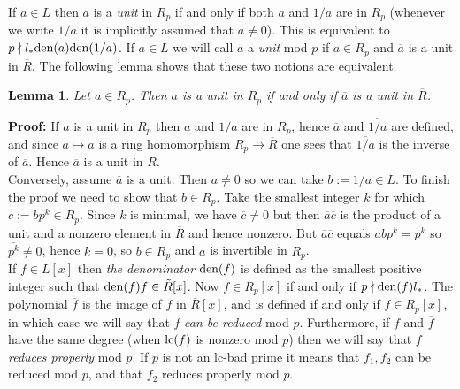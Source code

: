 \documentclass[10pt]{article}
\newcommand{\notdivides}{\nmid}
\newtheorem{lemma}{Lemma}
\newcommand{\x}{x}
\newcommand{\bad}{lc-bad }
\begin{document}
If $a \in L$ then $a$ is a {\em unit} in $R_p$ if and only if both $a$ and $1/a$
are in $R_p$  (whenever we write $1/a$ it is implicitly assumed that $a \neq 0$).
This is equivalent to $p \notdivides l_*{\rm den}(a){\rm den}(1/a)$.
If $a \in L$ we will call $a$ a {\em unit} mod $p$ if $a \in R_p$
and $\overline{a}$ is a unit in $\overline{R}$. The following lemma shows
that these two notions are equivalent.

\begin{lemma}
\label{unitmodp}
Let $a \in R_p$. Then
$a$ is a unit in $R_p$
if and only if $\overline{a}$ is a unit in $\overline{R}$.
\end{lemma}
{\bf Proof:}
If $a$ is a unit in $R_p$ then $a$ and $1/a$ are in $R_p$, hence
$\overline{a}$ and $\overline{1/a}$ are defined,
and since $a \mapsto \overline{a}$ is a ring homomorphism $R_p \rightarrow \overline{R}$
one sees that
$\overline{1/a}$ is the inverse of $\overline{a}$. Hence
$\overline{a}$ is a unit in $\overline{R}$. \\
Conversely, assume $\overline{a}$ is a unit. Then $a \neq 0$
so we can take $b:=1/a \in L$. To finish the proof we
need to show that $b \in R_p$.
Take the smallest integer $k$ for which $c := bp^k \in R_p$.
Since $k$ is minimal, we have $\overline{c} \neq 0$
but then $\overline{a}\overline{c}$ is the product of a unit
and a nonzero element in $\overline{R}$ and hence nonzero.
But $\overline{a}\overline{c}$ equals $\overline{abp^k} = \overline{p^k}$
so $\overline{p^k} \neq 0$, hence $k=0$, so $b \in R_p$ and $a$
is invertible in $R_p$.
\\


If $f \in L[\x]$ then
{\em the denominator} ${\rm den}(f)$ is defined as
the smallest positive integer such that
${\rm den}(f)f \in \tilde{R}[\x]$.
Now $f \in R_p[\x]$ if and only if $p \notdivides {\rm den}(f) l_*$.
The polynomial $\overline{f}$ is the image of $f$ in $\overline{R}[\x]$, and
is defined if and only if $f \in R_p[\x]$, in which case we 
will say that $f$ {\em can be reduced} mod $p$.
Furthermore, if $f$ and $\overline{f}$ have the same degree
(when ${\rm lc}(f)$ is nonzero mod $p$)
then we will say that $f$ {\em reduces properly} mod $p$.
If $p$ is not an \bad prime it means
that $f_1,f_2$ can be reduced mod $p$, and that $f_2$ reduces
properly mod $p$.
\end{document}
